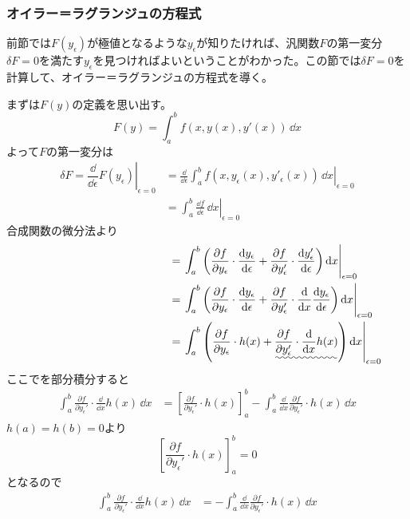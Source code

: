 \subsubsection{オイラー＝ラグランジュの方程式}

前節では$F(y_\epsilon)$が極値となるような$y_\epsilon$が知りたければ、汎関数$F$の第一変分$\delta F = 0$を満たす$y_\epsilon$を見つければよいということがわかった。この節では$\delta F = 0$を計算して、オイラー＝ラグランジュの方程式を導く。\par
まずは$F(y)$の定義を思い出す。
$$ F(y) = \int_a^b f(x,y(x),y'(x)) \,\dd x$$
よって$F$の第一変分は
\begin{align*}
  \delta F
  = \left. \dfrac{\dd}{\dd \epsilon}F(y_\epsilon) \right|_{\epsilon = 0}
  &= \left. \frac{\dd}{\dd \epsilon} \int_a^b f(x,y_\epsilon (x),y'_\epsilon (x)) \,\dd x \right|_{\epsilon = 0} \\
  &= \left. \int_a^b \frac{\dd f}{\dd \epsilon} \,\dd x \right|_{\epsilon = 0}
\end{align*}
合成関数の微分法より
\begin{align*}
  \hspace{43mm} &= \left. \int_a^b \left( \frac{\partial f}{\partial y_\epsilon} \cdot \frac{\dd y_\epsilon}{\dd \epsilon} + \frac{\partial f}{\partial y_\epsilon'} \cdot \frac{\dd y_\epsilon'}{\dd \epsilon} \right) \dd x \right|_{\epsilon = 0} \\
  &= \left. \int_a^b \left( \frac{\partial f}{\partial y_\epsilon} \cdot \frac{\dd y_\epsilon}{\dd \epsilon} + \frac{\partial f}{\partial y_\epsilon'} \cdot \frac{\dd}{\dd x} \frac{\dd y_\epsilon}{\dd \epsilon} \right)\dd x \right|_{\epsilon = 0} \\
  &= \left. \int_a^b \left( \frac{\partial f}{\partial y_\epsilon} \cdot h(x) + \uwave{\frac{\partial f}{\partial y_\epsilon'} \cdot \frac{\dd}{\dd x}h(x)} \right)\dd x \right|_{\epsilon = 0}
\end{align*}
ここでを部分積分すると
\begin{align*}
  \int_a^b \frac{\partial f}{\partial y_\epsilon'} \cdot \frac{\dd}{\dd x}h(x) \,\dd x
  &= \left[ \frac{\partial f}{\partial y_\epsilon'} \cdot h(x) \right]_a^b - \int_a^b \frac{\dd}{\dd x}\frac{\partial f}{\partial y_\epsilon'} \cdot h(x) \,\dd x
\end{align*}
$h(a) = h(b) = 0$より
$$\left[ \frac{\partial f}{\partial y_\epsilon'} \cdot h(x) \right]_a^b = 0$$
となるので
\begin{align*}
  \int_a^b \frac{\partial f}{\partial y_\epsilon'} \cdot \frac{\dd}{\dd x}h(x) \,\dd x
  &= - \int_a^b \frac{\dd}{\dd x}\frac{\partial f}{\partial y_\epsilon'} \cdot h(x) \,\dd x
\end{align*}
